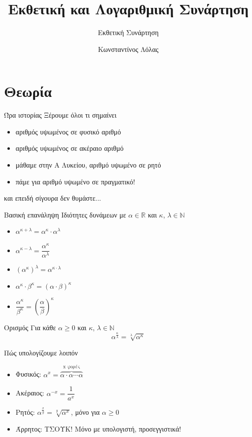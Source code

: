 \documentclass{presentation}
\title{Εκθετική και Λογαριθμική Συνάρτηση}
\subtitle{Εκθετική Συνάρτηση}
\author[Λόλας]{Κωνσταντίνος Λόλας}
\date{}
\begin{document}
\begin{frame}
  \titlepage
\end{frame}

\section{Θεωρία}
\begin{frame}{Ώρα ιστορίας}
  Ξέρουμε όλοι τι σημαίνει
  \begin{itemize}
    \item<1-> αριθμός υψωμένος σε φυσικό αριθμό
    \item<2-> αριθμός υψωμένος σε ακέραιο αριθμό
    \item<3-> μάθαμε στην Α Λυκείου, αριθμό υψωμένο σε ρητό
    \item<4-> πάμε για αριθμό υψωμένο σε πραγματικό!
  \end{itemize}
   και επειδή σίγουρα δεν θυμάστε...
\end{frame}

\begin{frame}{Βασική επανάληψη}
  Ιδιότητες δυνάμεων με $α\in \mathbb{R}$ και $κ$, $λ\in\mathbb{N}$
  \begin{itemize}
    \item<1-> $α^{κ+λ}=α^κ\cdot α^λ$
    \item<2-> $α^{κ-λ}=\dfrac{α^κ}{α^λ}$
    \item<3-> $\left( α^κ \right)^λ=α^{κ\cdot λ}$
    \item<4-> $α^κ\cdot β^κ=(α\cdot β)^κ$
    \item<5-> $\dfrac{α^κ}{β^κ}=\left(   \dfrac{α}{β}\right)^κ$
  \end{itemize}
  \begin{block}{Ορισμός}
    Για κάθε $α\ge 0$ και $κ$, $λ\in\mathbb{N}$
    $$α^{\frac{κ}{λ}}=\sqrt[λ]{α^κ}$$
  \end{block}
\end{frame}

\begin{frame}{Πώς υπολογίζουμε λοιπόν}
  \begin{itemize}
    \item<1-> Φυσικός: $α^x=\overbrace{α\cdot α \cdots α}^{\text{x φορές}}$
    \item<2-> Ακέραιος: $α^{-x}=\dfrac{1}{a^x}$
    \item<3-> Ρητός: $α^{\frac{x}{y}}=\sqrt[y]{α^x}$, μόνο για $α\ge 0$
    \item<4-> Άρρητος: ΤΣΟΥΚ! Μόνο με υπολογιστή, προσεγγιστικά!
  \end{itemize}
\end{frame}
\end{document}
